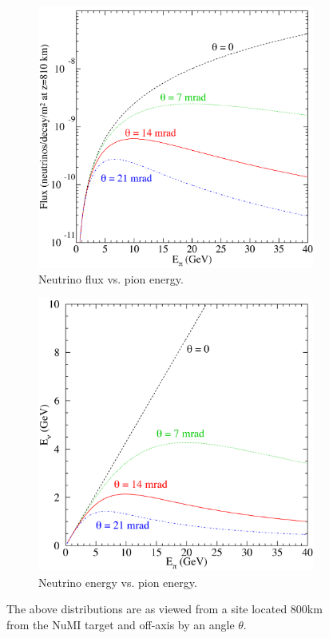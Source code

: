 \begin{figure}
  \centering
  \begin{subfigure}[b]{0.45\textwidth}
  \includegraphics[width=\textwidth]{../../img/baird/beam/020-flux.png}
  \caption{Neutrino flux vs. pion energy. }
  \label{fig:NuPiFluxa}
  \end{subfigure}
  \hfill
  \begin{subfigure}[b]{0.45\textwidth}
  \includegraphics[width=\textwidth]{../../img/baird/beam/030-epi2enu.png}
  \caption{Neutrino energy vs. pion energy.}
  \label{fig:NuPiFluxb}
  \end{subfigure}
  \caption{The above distributions are as viewed from a site located
    800km from the NuMI target and off-axis by an angle $\theta$.}
  \label{fig:NuPiFlux}
\end{figure}



